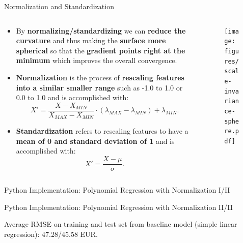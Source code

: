 \documentclass[main.tex]{subfiles}
\begin{document}
    \begin{frame}{Normalization and Standardization}
        \begin{columns}
            \begin{column}{0.6\textwidth}
                \begin{itemize}
                    \item By \textbf{normalizing/standardizing} we can \textbf{reduce the curvature} and thus making the \textbf{surface more spherical} so that the \textbf{gradient points right at the minimum} which improves the overall convergence.
                    \item \textbf{Normalization} is the process of \textbf{rescaling features into a similar smaller range} such as -1.0 to 1.0 or 0.0 to 1.0 and is accomplished with:
                    $$X' = \frac{X - X_{MIN}}{X_{MAX} - X_{MIN}} \cdot (\lambda_{MAX} - \lambda_{MIN}) + \lambda_{MIN}.$$
                    \item \textbf{Standardization} refers to rescaling features to have a \textbf{mean of 0 and standard deviation of 1} and is accomplished with:
                    $$X' = \frac{X - \mu}{\sigma}.$$
                \end{itemize}
            \end{column}
            \begin{column}{0.4\textwidth}
                \begin{figure}
                    \label{fig:scale-invariance-sphere}
                    \texttt{[image: figures/scale-invariance-sphere.pdf]}
                \end{figure}
            \end{column}
        \end{columns}
    \end{frame}

    \begin{frame}{Python Implementation: Polynomial Regression with Normalization I/II}
        
\end{frame}

    \begin{frame}{Python Implementation: Polynomial Regression with Normalization II/II}
        
        Average RMSE on training and test set from baseline model (simple linear regression): 47.28/45.58 EUR.
    \end{frame}
\end{document}
